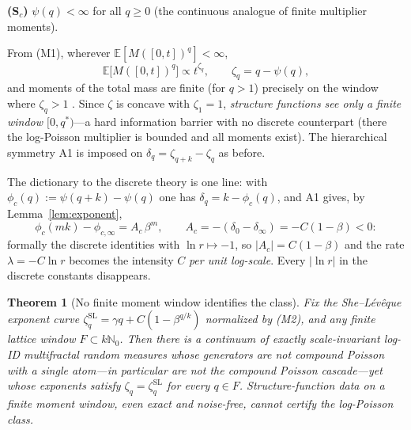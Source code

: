 \documentclass[pdflatex,sn-mathphys-num]{sn-jnl}
\theoremstyle{thmstyleone}
\newtheorem{theorem}{Theorem}
\theoremstyle{thmstyletwo}
\theoremstyle{thmstylethree}
\begin{document}
\smallskip
\noindent\textbf{(S$_c$)}  $\psi(q) < \infty$ for all $q \ge 0$ (the
continuous analogue of finite multiplier moments).

\smallskip
From (M1), wherever $\mathbb{E}[M([0,t])^q] < \infty$,
\[
  \mathbb{E}\bigl[M([0,t])^q\bigr] \propto t^{\zeta_q},
  \qquad
  \zeta_q = q - \psi(q),
\]
and moments of the total mass are finite (for $q > 1$) precisely on
the window where $\zeta_q > 1$ \cite{BM03}.  Since $\zeta$ is
concave with $\zeta_1 = 1$, \emph{structure functions see only a
finite window $[0, q^*)$}---a hard information barrier with no
discrete counterpart (there the log-Poisson multiplier is bounded
and all moments exist).  The hierarchical symmetry A1 is imposed on
$\delta_q = \zeta_{q+k} - \zeta_q$ as before.

The dictionary to the discrete theory is one line: with $\phi_c(q)
:= \psi(q+k) - \psi(q)$ one has $\delta_q = k - \phi_c(q)$, and A1
gives, by Lemma~\ref{lem:exponent},
\[
  \phi_c(mk) - \phi_{c,\infty} = A_c\,\beta^m,
  \qquad
  A_c = -(\delta_0 - \delta_\infty) = -C(1-\beta) < 0 :
\]
formally the discrete identities with $\ln r \mapsto -1$, so $|A_c|
= C(1-\beta)$ and the rate $\lambda = -C\ln r$ becomes the intensity
$C$ \emph{per unit log-scale}.  Every $|\ln r|$ in the discrete
constants disappears.

\begin{theorem}[No finite moment window identifies the
class]\label{thm:window}
Fix the She--L\'ev\^eque exponent curve $\zeta^{\mathrm{SL}}_q =
\gamma q + C(1-\beta^{q/k})$ normalized by \textup{(M2)}, and any
finite lattice window $F \subset k\mathbb{N}_0$.  Then there is a
continuum of exactly scale-invariant log-ID multifractal random
measures whose generators are not compound Poisson with a single
atom---in particular are not the compound Poisson cascade---yet
whose exponents satisfy $\zeta_q = \zeta^{\mathrm{SL}}_q$ for every
$q \in F$.  Structure-function data on a finite moment window, even
exact and noise-free, cannot certify the log-Poisson class.
\end{theorem}
\end{document}
